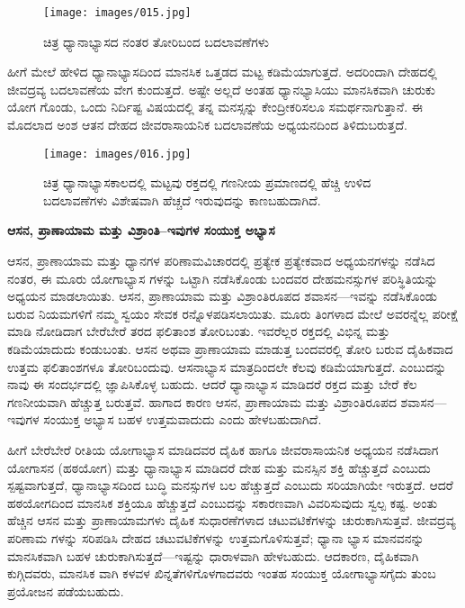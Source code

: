 \begin{center}
\end{center}


\begin{figure}
\texttt{[image: images/015.jpg]}
\caption{ಚಿತ್ರ  ಧ್ಯಾನಾಭ್ಯಾಸದ ನಂತರ ತೋರಿಬಂದ ಬದಲಾವಣೆಗಳು}
\end{figure}

ಹೀಗೆ ಮೇಲೆ ಹೇಳಿದ ಧ್ಯಾನಾಭ್ಯಾಸದಿಂದ ಮಾನಸಿಕ ಒತ್ತಡದ ಮಟ್ಟ ಕಡಿಮೆಯಾಗುತ್ತದೆ. ಅದರಿಂದಾಗಿ ದೇಹದಲ್ಲಿ ಜೀವದ್ರವ್ಯ ಬದಲಾವಣೆಯ ವೇಗ ಕುಂದುತ್ತದೆ. ಅಷ್ಟೇ ಅಲ್ಲದೆ ಅಂತಹ ಧ್ಯಾನಭ್ಯಾಸಿಯು ಮಾನಸಿಕವಾಗಿ ಚುರುಕು ಯೋಗ ಗೊಂಡು, ಒಂದು ನಿರ್ದಿಷ್ಟ ವಿಷಯದಲ್ಲಿ ತನ್ನ ಮನಸ್ಸನ್ನು ಕೇಂದ್ರೀಕರಿಸಲೂ ಸಮರ್ಥನಾಗುತ್ತಾನೆ. ಈ ಮೊದಲಾದ ಅಂಶ ಆತನ ದೇಹದ ಜೀವರಾಸಾಯನಿಕ ಬದಲಾವಣೆಯ ಅಧ್ಯಯನದಿಂದ ತಿಳಿದುಬರುತ್ತದೆ.

\begin{center}
\end{center}


\begin{figure}
\texttt{[image: images/016.jpg]}
\caption{ಚಿತ್ರ  ಧ್ಯಾನಾಭ್ಯಾಸಕಾಲದಲ್ಲಿ  ಮಟ್ಟವು ರಕ್ತದಲ್ಲಿ ಗಣನೀಯ ಪ್ರಮಾಣದಲ್ಲಿ ಹೆಚ್ಚಿ ಉಳಿದ ಬದಲಾವಣೆಗಳು ವಿಶೇಷವಾಗಿ ಹೆಚ್ಚದೆ ಇರುವುದನ್ನು ಕಾಣಬಹುದಾಗಿದೆ.}
\end{figure}

\textbf{ಆಸನ, ಪ್ರಾಣಾಯಾಮ ಮತ್ತು ವಿಶ್ರಾಂತಿ–ಇವುಗಳ ಸಂಯುಕ್ತ ಅಭ್ಯಾಸ}

ಆಸನ, ಪ್ರಾಣಾಯಾಮ ಮತ್ತು ಧ್ಯಾನಗಳ ಪರಿಣಾಮವಿಚಾರದಲ್ಲಿ ಪ್ರತ್ಯೇಕ ಪ್ರತ್ಯೇಕವಾದ ಅಧ್ಯಯನಗಳನ್ನು ನಡೆಸಿದ ನಂತರ, ಈ ಮೂರು ಯೋಗಾಭ್ಯಾಸ ಗಳನ್ನು ಒಟ್ಟಾಗಿ ನಡೆಸಿಕೊಂಡು ಬಂದವರ ದೇಹಮನಸ್ಸುಗಳ ಪರಿಸ್ಥಿತಿಯನ್ನು ಅಧ್ಯಯನ ಮಾಡಲಾಯಿತು. ಆಸನ, ಪ್ರಾಣಾಯಾಮ ಮತ್ತು ವಿಶ್ರಾಂತಿರೂಪದ ಶವಾಸನ—ಇವನ್ನು ನಡೆಸಿಕೊಂಡು ಬರುವ ನಿಯಮಗಳಿಗೆ ನಮ್ಮ ಸ್ವಯಂ ಸೇವಕ ರನ್ನೊಳಪಡಿಸಲಾಯಿತು. ಮೂರು ತಿಂಗಳಾದ ಮೇಲೆ ಅವರನ್ನೆಲ್ಲ ಪರೀಕ್ಷೆ ಮಾಡಿ ನೋಡಿದಾಗ ಬೇರೆಬೇರೆ ತರದ ಫಲಿತಾಂಶ ತೋರಿಬಂತು. ಇವರೆಲ್ಲರ ರಕ್ತದಲ್ಲಿ ವಿಭಿನ್ನ  ಮತ್ತು  ಕಡಿಮೆಯಾದುದು ಕಂಡುಬಂತು. ಆಸನ ಅಥವಾ ಪ್ರಾಣಾಯಾಮ ಮಾಡುತ್ತ ಬಂದವರಲ್ಲಿ ತೋರಿ ಬರುವ ದೈಹಿಕವಾದ ಉತ್ತಮ ಫಲಿತಾಂಶಗಳೂ ತೋರಿಬಂದುವು. ಆಸನಾಭ್ಯಾಸ ಮಾತ್ರದಿಂದಲೇ ಕೆಲವು  ಕಡಿಮೆಯಾಗುತ್ತದೆ. ಎಂಬುದನ್ನು ನಾವು ಈ ಸಂದರ್ಭದಲ್ಲಿ ಜ್ಞಾಪಿಸಿಕೊಳ್ಳ ಬಹುದು. ಆದರೆ ಧ್ಯಾನಾಭ್ಯಾಸ ಮಾಡಿದರೆ ರಕ್ತದ  ಮತ್ತು ಬೇರೆ ಕೆಲ  ಗಣನೀಯವಾಗಿ ಹೆಚ್ಚುತ್ತ ಬರುತ್ತವೆ. ಹಾಗಾದ ಕಾರಣ ಆಸನ, ಪ್ರಾಣಾಯಾಮ ಮತ್ತು ವಿಶ್ರಾಂತಿರೂಪದ ಶವಾಸನ—ಇವುಗಳ ಸಂಯುಕ್ತ ಅಭ್ಯಾಸ ಬಹಳ ಉತ್ತಮವಾದುದು ಎಂದು ಹೇಳಬಹುದಾಗಿದೆ.

ಹೀಗೆ ಬೇರೆಬೇರೆ ರೀತಿಯ ಯೋಗಾಭ್ಯಾಸ ಮಾಡಿದವರ ದೈಹಿಕ ಹಾಗೂ ಜೀವರಾಸಾಯನಿಕ ಅಧ್ಯಯನ ನಡೆಸಿದಾಗ ಯೋಗಾಸನ (ಹಠಯೋಗ) ಮತ್ತು ಧ್ಯಾನಾಭ್ಯಾಸ ಮಾಡಿದರೆ ದೇಹ ಮತ್ತು ಮನಸ್ಸಿನ ಶಕ್ತಿ ಹೆಚ್ಚುತ್ತದೆ ಎಂಬುದು ಸ್ಪಷ್ಟವಾಗುತ್ತದೆ, ಧ್ಯಾನಾಭ್ಯಾಸದಿಂದ ಬುದ್ಧಿ ಮನಸ್ಸುಗಳ ಬಲ ಹೆಚ್ಚುತ್ತದೆ ಎಂಬುದು ಸರಿಯಾಗಿಯೇ ಇರುತ್ತದೆ. ಆದರೆ ಹಠಯೋಗದಿಂದ ಮಾನಸಿಕ ಶಕ್ತಿಯೂ ಹೆಚ್ಚುತ್ತದೆ ಎಂಬುದನ್ನು ಸಕಾರಣವಾಗಿ ವಿವರಿಸುವುದು ಸ್ವಲ್ಪ ಕಷ್ಟ. ಅಂತು ಹೆಚ್ಚಿನ ಆಸನ ಮತ್ತು ಪ್ರಾಣಾಯಾಮಗಳು ದೈಹಿಕ ಸುಧಾರಣೆಗಳಾದ  ಚಟುವಟಿಕೆಗಳನ್ನು ಚುರುಕಾಗಿಸುತ್ತವೆ. ಜೀವದ್ರವ್ಯ ಪರಿಣಾಮ ಗಳನ್ನು ಸರಿಪಡಿಸಿ ದೇಹದ ಚಟುವಟಿಕೆಗಳನ್ನು ಉತ್ತಮಗೊಳಿಸುತ್ತವೆ; ಧ್ಯಾನಾ ಭ್ಯಾಸ ಮಾನವನನ್ನು ಮಾನಸಿಕವಾಗಿ ಬಹಳ ಚುರುಕಾಗಿಸುತ್ತದೆ—ಇಷ್ಟನ್ನು ಧಾರಾಳವಾಗಿ ಹೇಳಬಹುದು. ಆದಕಾರಣ, ದೈಹಿಕವಾಗಿ ಕುಗ್ಗಿದವರು, ಮಾನಸಿಕ ವಾಗಿ ಕಳವಳ ಖಿನ್ನತೆಗಳಿಗೊಳಗಾದವರು ಇಂತಹ ಸಂಯುಕ್ತ ಯೋಗಾಭ್ಯಾಸಗೈದು ತುಂಬ ಪ್ರಯೋಜನ ಪಡೆಯಬಹುದು.

